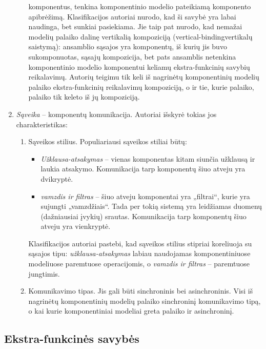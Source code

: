 \begin{enumerate}
\begin{enumerate}
        komponentus, tenkina komponentinio modelio pateikiamą
        komponento apibrėžimą. Klasifikacijos autoriai nurodo, kad
        ši savybė yra labai naudinga, bet sunkiai pasiekiama. Jie taip
        pat nurodo, kad nemažai modelių palaiko dalinę vertikalią
        kompoziciją (\gls{vertical-binding}{vertikalų saistymą}):
        ansamblio sąsajos yra komponentų, iš kurių jis buvo
        sukomponuotas, sąsajų kompozicija, bet pats ansamblis
        netenkina komponentinio modelio komponentui keliamų
        ekstra-funkcinių savybių reikalavimų. Autorių teigimu tik keli iš
        nagrinėtų komponentinių modelių palaiko ekstra-funkcinių
        reikalavimų kompoziciją, o ir tie, kurie palaiko, palaiko tik
        keleto iš jų kompoziciją.
    \end{enumerate}
  \item \emph{Sąveika}  – komponentų komunikacija.
    Autoriai išskyrė tokias jos charakteristikas:
    \begin{enumerate}
      \item Sąveikos stilius. Populiariausi sąveikos stiliai būtų:
        \begin{itemize}
          \item \emph{Užklausa-atsakymas}  –
            vienas komponentas kitam siunčia užklausą ir laukia atsakymo.
            Komunikacija tarp komponentų šiuo atveju yra dvikryptė.
          \item \emph{vamzdis ir filtras}  –
            šiuo atveju komponentai yra „filtrai“, kurie yra sujungti
            „vamzdžiais“. Tada per tokią sistemą yra leidžiamas
            duomenų (dažniausiai įvykių) srautas. Komunikacija
            tarp komponentų šiuo atveju yra vienkryptė.
        \end{itemize}
        Klasifikacijos autoriai pastebi, kad sąveikos stilius stipriai
        koreliuoja su sąsajos tipu: \emph{užklausa-atsakymas}
        labiau naudojamas komponentiniuose modeliuose paremtuose
        operacijomis, o \emph{vamzdis ir filtras} – paremtuose
        jungtimis.
      \item Komunikavimo tipas. Jis gali būti sinchroninis bei
        asinchroninis. Visi iš nagrinėtų komponentinių modelių
        palaiko sinchroninį komunikavimo tipą, o kai kurie
        komponentiniai modeliai greta palaiko ir asinchroninį.
    \end{enumerate}
\end{enumerate}

\subsection{Ekstra-funkcinės savybės}

